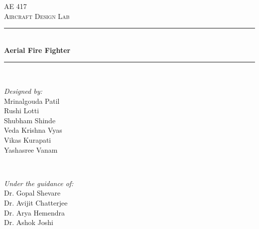 \begin{titlepage}

\newcommand{\HRule}{\rule{\linewidth}{0.5mm}} %

\center %
 
\textsc{\Large AE 417}\\[0.5cm] %
\textsc{\large Aircraft Design Lab}\\[0.5cm] %


\HRule \\[0.4cm]
{ \huge \bfseries Aerial Fire Fighter}\\[0.4cm] %
\HRule \\[1.5cm]
 

\begin{minipage}{0.4\textwidth}
\begin{flushleft} \large
\emph{Designed by:}\\
Mrinalgouda Patil\\
Rushi Lotti\\ %
Shubham Shinde\\
Veda Krishna Vyas\\
Vikas Kurapati\\
Yashasree Vanam\\
\end{flushleft}
\end{minipage}
~
\begin{minipage}{0.4\textwidth}
\begin{flushright} \large
\emph{Under the guidance of:} \\
Dr. Gopal Shevare\\
Dr. Avijit Chatterjee \\
Dr. Arya Hemendra\\
Dr. Ashok Joshi\\
\end{flushright}
\end{minipage}\\[2cm]


\end{titlepage}
